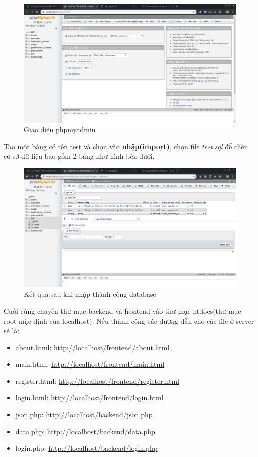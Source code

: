 \documentclass[a4paper]{article}
\begin{document}
    \begin{figure}[htp]
        \centering
        \includegraphics[scale=0.3]{phpmyadmin.png}
        \caption{Giao diện phpmyadmin}
        \label{fig:my_label}
    \end{figure}
    Tạo một bảng có tên test và chọn vào \textbf{nhập(import)}, chọn file \textit{test.sql} để chèn cơ sở dữ liệu bao gồm 2 bảng như hình bên dưới.
    \begin{figure}[htp]
        \centering
        \includegraphics[scale=0.3]{database.png}
        \caption{Kết quả sau khi nhập thành công database}
        \label{fig:my_label}
    \end{figure}
    
    Cuối cùng chuyển thư mục backend và frontend vào thư mục htdocs(thư mục root mặc định của localhost). Nếu thành công các đường dẫn cho các file ở server sẽ là:
    \begin{itemize}
        \item about.html: \url{http://localhost/frontend/about.html}
        \item main.html: \url{http://localhost/frontend/main.html}
        \item register.html: \url{http://localhost/frontend/register.html}
        \item login.html:
        \url{http://localhost/frontend/login.html}
        \item json.php: \url{http://localhost/backend/json.php}
        \item data.php: \url{http://localhost/backend/data.php}
        \item login.php: \url{http://localhost/backend/login.php}
    \end{itemize}
\end{document}
